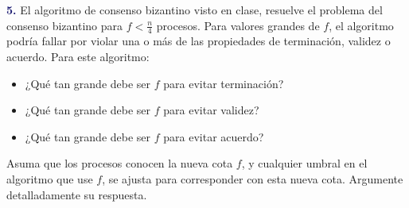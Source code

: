\newpage
\textbf{\textcolor{MidnightBlue}{5.}} El algoritmo de consenso bizantino visto en clase, resuelve el problema del consenso
bizantino para $f < \frac{n}{4}$ procesos. Para valores grandes de $f$, el algoritmo podría fallar por violar una o más de las propiedades de terminación, validez o acuerdo. Para este algoritmo:
\begin{itemize}
    \item ¿Qué tan grande debe ser $f$ para evitar terminación?
    \item ¿Qué tan grande debe ser $f$ para evitar validez?
    \item ¿Qué tan grande debe ser $f$ para evitar acuerdo?
\end{itemize}
Asuma que los procesos conocen la nueva cota $f$, y cualquier umbral en el algoritmo que use $f$, se ajusta para corresponder con esta nueva cota. Argumente detalladamente su respuesta.


